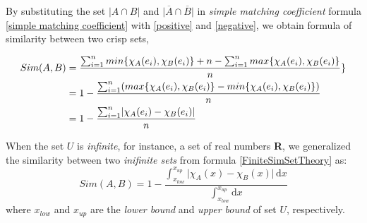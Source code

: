 By substituting  the set $\lvert A \cap B \rvert$ and $\lvert \overline{A} \cap \overline{B} \rvert$ in \textit{simple matching coefficient} formula \eqref{simple matching coefficient} with \eqref{positive} and \eqref{negative}, we obtain formula of similarity between two crisp sets,

\begin{align}
Sim(A,B) & = \frac{\sum_{i=1}^{n} min\{\chi_{A}(e_i), \chi_{B}(e_i)\}+n-\sum_{i=1}^{n} max\{\chi_{A}(e_i), \chi_{B}(e_i)\}}{n}\}\notag \\
&=1-\frac{\sum_{i=1}^{n} (max\{\chi_{A}(e_i), \chi_{B}(e_i)\}- min\{\chi_{A}(e_i), \chi_{B}(e_i)\})}{n}\notag \\
&=1-\frac{\sum_{i=1}^{n} \lvert \chi_{A}(e_i) - \chi_{B}(e_i) \rvert}{n}\notag \label{FiniteSimSetTheory}\\
\end{align}

When the set $U$ is \textit{infinite}, for instance, a set of real numbers \textbf{R}, we generalized the similarity between two \textit{inifinite sets} from formula \eqref{FiniteSimSetTheory} as:
\begin{equation}\label{InfiniteSimSetTheory}
Sim(A,B)=1- \frac{\int_{x_{low}}^{x_{up}}\lvert \chi_{A}(x) - \chi_{B}(x) \rvert\, \mathrm{d}x}{\int_{x_{low}}^{x_{up}}\mathrm{d}x}
\end{equation}
where $x_{low}$ and $x_{up}$ are the \textit{lower bound} and \textit{upper bound} of set $U$, respectively.

 